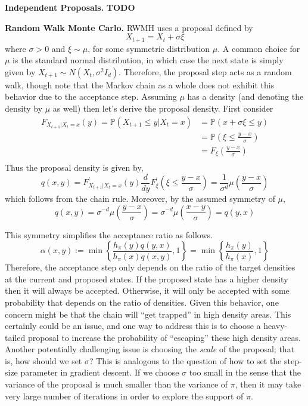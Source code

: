 \documentclass[12pt]{article}
\newcommand{\Prob}{\mathbb{P}}
\begin{document}
\bigskip

\textbf{Independent Proposals.} \textbf{TODO} 

\bigskip

\textbf{Random Walk Monte Carlo.} RWMH uses a proposal defined by
\[X_{t + 1} = X_t + \sigma \xi \]
where $\sigma > 0$ and $\xi \sim \mu$, for some symmetric distribution $\mu$. A common choice for $\mu$ is the standard normal distribution, in which case the next 
state is simply given by $X_{t + 1} \sim N(X_t, \sigma^2 I_d)$. Therefore, the proposal step acts as a random walk, though note that the Markov chain as a whole does not 
exhibit this behavior due to the acceptance step. Assuming $\mu$ has a density (and denoting the density by $\mu$ as well) then let's derive the proposal density. 
First consider
\begin{align*}
F_{X_{t + 1}|X_t=x}(y) = \Prob(X_{t + 1} \leq y|X_t=x) &= \Prob(x + \sigma \xi \leq y) \\
									 	 &= \Prob\left(\xi \leq \frac{y - x}{\sigma}\right) \\
									 	 &= F_{\xi}\left(\frac{y - x}{\sigma}\right) \\
\end{align*}
Thus the proposal density is given by, 
\[q(x, y) = F_{X_{t + 1}|X_t=x}^\prime(y) \frac{d}{dy}F_{\xi}^\prime \left(\xi \leq \frac{y - x}{\sigma}\right) = \frac{1}{\sigma^d}\mu\left(\frac{y - x}{\sigma}\right)\]
which follows from the chain rule. Moreover, by the assumed symmetry of $\mu$, 
\[q(x, y) = \sigma^{-d} \mu\left(\frac{y - x}{\sigma}\right) = \sigma^{-d} \mu\left(\frac{x - y}{\sigma}\right) = q(y, x)\]

This symmetry simplifies the acceptance ratio as follows.  
\[\alpha(x, y) := \min\left\{\frac{h_\pi(y) q(y, x)}{h_\pi(x)q(x, y)}, 1\right\} = \min\left\{\frac{h_\pi(y)}{h_\pi(x)}, 1\right\} \]
Therefore, the acceptance step only depends on the ratio of the target densities at the current and proposed states. If the proposed state has a higher density then it will 
always be accepted. Otherwise, it will only be accepted with some probability that depends on the ratio of densities. Given this behavior, one concern might be that the 
chain will ``get trapped'' in high density areas. This certainly could be an issue, and one way to address this is to choose a heavy-tailed proposal to increase the probability
of ``escaping'' these high density areas. Another potentially challenging issue is choosing the \textit{scale} of the proposal; that is, how should we set $\sigma$? This is 
analogous to the question of how to set the step-size parameter in gradient descent. If we choose $\sigma$ too small in the sense that the variance of the proposal is much 
smaller than the variance of $\pi$, then it may take very large number of iterations in order to explore the support of $\pi$. 
\end{document}
